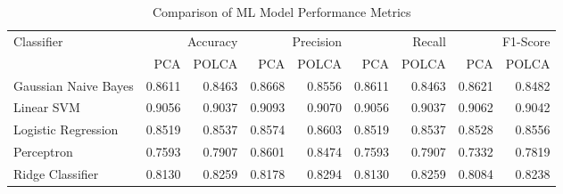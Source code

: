 \begin{table}[htbp]
\caption{Comparison of ML Model Performance Metrics}
\label{tab:model_comparison}
\begin{tabular}{lrrrrrrrr}
\toprule
Classifier & \multicolumn{2}{r}{Accuracy} & \multicolumn{2}{r}{Precision} & \multicolumn{2}{r}{Recall} & \multicolumn{2}{r}{F1-Score} \\
 & PCA & POLCA & PCA & POLCA & PCA & POLCA & PCA & POLCA \\
\midrule
Gaussian Naive Bayes & 0.8611 & 0.8463 & 0.8668 & 0.8556 & 0.8611 & 0.8463 & 0.8621 & 0.8482 \\
Linear SVM & 0.9056 & 0.9037 & 0.9093 & 0.9070 & 0.9056 & 0.9037 & 0.9062 & 0.9042 \\
Logistic Regression & 0.8519 & 0.8537 & 0.8574 & 0.8603 & 0.8519 & 0.8537 & 0.8528 & 0.8556 \\
Perceptron & 0.7593 & 0.7907 & 0.8601 & 0.8474 & 0.7593 & 0.7907 & 0.7332 & 0.7819 \\
Ridge Classifier & 0.8130 & 0.8259 & 0.8178 & 0.8294 & 0.8130 & 0.8259 & 0.8084 & 0.8238 \\
\bottomrule
\end{tabular}
\end{table}
